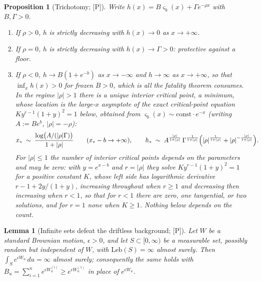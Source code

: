\documentclass[11pt]{article}
\newtheorem{proposition}[theorem]{Proposition}
\newtheorem{lemma}[theorem]{Lemma}
\theoremstyle{definition}
\theoremstyle{remark}
\begin{document}
\begin{proposition}[Trichotomy; {[P]}]\label{prop:trichotomy}
Write $h(x)=B\varsigma_b(x)+\Gamma e^{-\rho x}$ with $B,\Gamma>0$.
\begin{enumerate}[label=\emph{(\roman*)},itemsep=1pt]
\item If $\rho>0$, $h$ is strictly decreasing with $h(x)\to0$ as
$x\to+\infty$.
\item If $\rho=0$, $h$ is strictly decreasing with $h(x)\to\Gamma>0$:
protective against a floor.
\item If $\rho<0$, $h\to B(1+e^{-b})$ as $x\to-\infty$ and
$h\to\infty$ as $x\to+\infty$, so that $\inf_xh(x)>0$ for frozen
$B>0$, which is all the fatality theorem consumes. In the regime
$|\rho|>1$ there is a unique interior critical point, a minimum, whose location
is the large-$x$ asymptote of the exact critical-point equation
$Ky^{r-1}(1+y)^2=1$ below, obtained from $\varsigma_b(x)\sim
\mathrm{const}\cdot e^{-x}$ (writing $A:=Be^{b}$, $|\rho|=-\rho$):
\begin{equation}\label{eq:xstar}
x_\ast\;\sim\;\frac{\log\bigl(A/(|\rho|\Gamma)\bigr)}{1+|\rho|}
\qquad(x_\ast-b\to+\infty),
\qquad
h_\ast\;\sim\;A^{\frac{|\rho|}{1+|\rho|}}\,\Gamma^{\frac{1}{1+|\rho|}}
\Bigl(|\rho|^{\frac{1}{1+|\rho|}}+|\rho|^{-\frac{|\rho|}{1+|\rho|}}\Bigr).
\end{equation}
For $|\rho|\le1$ the number of interior critical points depends on the
parameters and may be zero: with $y=e^{x-b}$ and $r=|\rho|$ they solve
$Ky^{r-1}(1+y)^2=1$ for a positive constant $K$, whose left side has
logarithmic derivative $r-1+2y/(1+y)$, increasing throughout when
$r\ge1$ and decreasing then increasing when $r<1$, so that for $r<1$
there are zero, one tangential, or two solutions, and for $r=1$ none
when $K\ge1$. Nothing below depends on the count.
\end{enumerate}
\end{proposition}

\begin{lemma}[Infinite sets defeat the driftless background; {[P]}]
\label{lem:infbackground}
Let $W$ be a standard Brownian motion, $\epsilon>0$, and let
$S\subset[0,\infty)$ be a measurable set, possibly random but
independent of $W$, with $\mathrm{Leb}(S)=\infty$ almost surely. Then
$\int_S e^{\epsilon W_u}\,du=\infty$ almost surely; consequently the
same holds with $B_u=\sum_{i=1}^ne^{\epsilon W^{(i)}_u}\ge
e^{\epsilon W^{(1)}_u}$ in place of $e^{\epsilon W_u}$.
\end{lemma}
\end{document}
